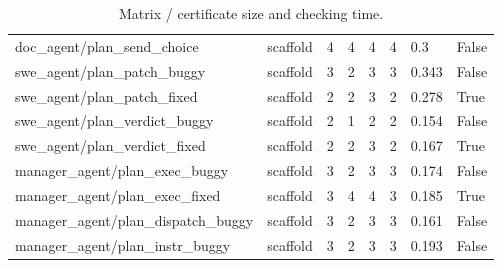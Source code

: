 \begin{table}[t]
\begin{tabular}{llllllll}
doc\_agent/plan\_send\_choice & scaffold & 4 & 4 & 4 & 4 & 0.3 & False \\
swe\_agent/plan\_patch\_buggy & scaffold & 3 & 2 & 3 & 3 & 0.343 & False \\
swe\_agent/plan\_patch\_fixed & scaffold & 2 & 2 & 3 & 2 & 0.278 & True \\
swe\_agent/plan\_verdict\_buggy & scaffold & 2 & 1 & 2 & 2 & 0.154 & False \\
swe\_agent/plan\_verdict\_fixed & scaffold & 2 & 2 & 3 & 2 & 0.167 & True \\
manager\_agent/plan\_exec\_buggy & scaffold & 3 & 2 & 3 & 3 & 0.174 & False \\
manager\_agent/plan\_exec\_fixed & scaffold & 3 & 4 & 4 & 3 & 0.185 & True \\
manager\_agent/plan\_dispatch\_buggy & scaffold & 3 & 2 & 3 & 3 & 0.161 & False \\
manager\_agent/plan\_instr\_buggy & scaffold & 3 & 2 & 3 & 3 & 0.193 & False \\
\bottomrule
\end{tabular}
\caption{Matrix / certificate size and checking time.}
\label{tab:certs}
\end{table}